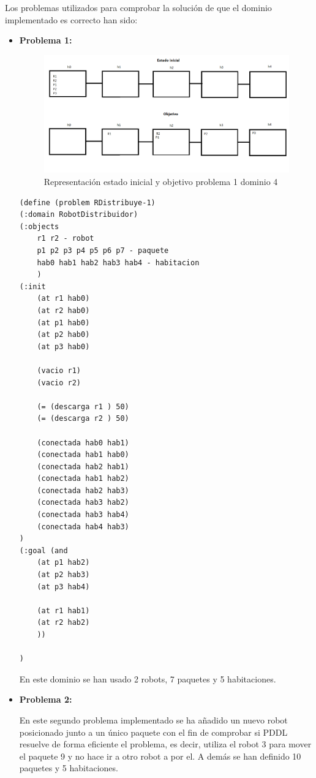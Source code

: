 Los problemas utilizados para comprobar la solución de que el dominio implementado es correcto han sido:

\begin{itemize}

\item \textbf{Problema 1:}

\begin{figure}[h]
	\centering
	\includegraphics[width=1\linewidth]{p4-1}
	\caption{Representación estado inicial y objetivo problema 1 dominio 4}
	\label{fig:p1}
\end{figure}

	\begin{lstlisting}[language=SH]
(define (problem RDistribuye-1)
(:domain RobotDistribuidor)
(:objects
	r1 r2 - robot
	p1 p2 p3 p4 p5 p6 p7 - paquete
	hab0 hab1 hab2 hab3 hab4 - habitacion
	)
(:init
	(at r1 hab0)
	(at r2 hab0)
	(at p1 hab0)
	(at p2 hab0)
	(at p3 hab0)

	(vacio r1)
	(vacio r2)
	
	(= (descarga r1 ) 50)
	(= (descarga r2 ) 50)
	
	(conectada hab0 hab1)
	(conectada hab1 hab0)
	(conectada hab2 hab1)
	(conectada hab1 hab2)
	(conectada hab2 hab3)
	(conectada hab3 hab2)
	(conectada hab3 hab4)
	(conectada hab4 hab3)
)
(:goal (and
	(at p1 hab2)
	(at p2 hab3)
	(at p3 hab4)
	
	(at r1 hab1)
	(at r2 hab2)
	))

)
	\end{lstlisting}

En este dominio se han usado 2 robots, 7 paquetes y 5 habitaciones. 


\item\textbf{ Problema 2:}

En este segundo problema implementado se ha añadido un nuevo robot posicionado junto a un único paquete con el fin de comprobar si PDDL resuelve de forma eficiente el problema, es decir, utiliza el robot 3 para mover el paquete 9 y no hace ir a otro robot a por el. A demás se han definido 10 paquetes y 5 habitaciones.\\


\end{itemize}
